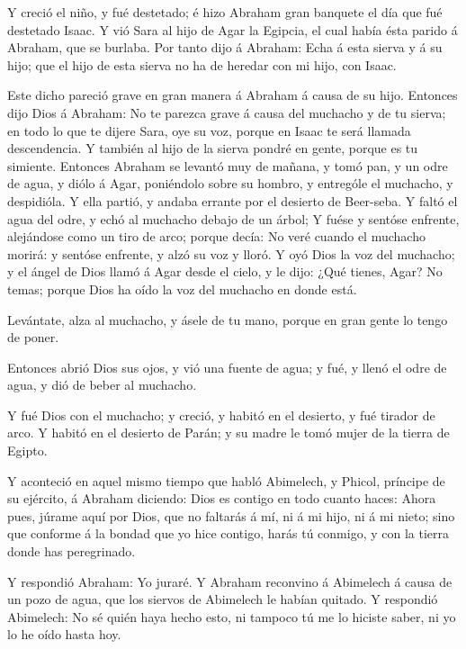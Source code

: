  Y creció el niño, y fué destetado; é hizo Abraham gran
banquete el día que fué destetado Isaac.  Y vió Sara al hijo
de Agar la Egipcia, el cual había ésta parido á Abraham, que se burlaba.
 Por tanto dijo á Abraham: Echa á esta sierva y á su hijo;
que el hijo de esta sierva no ha de heredar con mi hijo, con Isaac.

 Este dicho pareció grave en gran manera á Abraham á causa
de su hijo.  Entonces dijo Dios á Abraham: No te parezca
grave á causa del muchacho y de tu sierva; en todo lo que te dijere
Sara, oye su voz, porque en Isaac te será llamada descendencia.
 Y también al hijo de la sierva pondré en gente, porque es
tu simiente.  Entonces Abraham se levantó muy de mañana, y
tomó pan, y un odre de agua, y diólo á Agar, poniéndolo sobre su hombro,
y entrególe el muchacho, y despidióla. Y ella partió, y andaba errante
por el desierto de Beer-seba.  Y faltó el agua del odre, y
echó al muchacho debajo de un árbol;  Y fuése y sentóse
enfrente, alejándose como un tiro de arco; porque decía: No veré cuando
el muchacho morirá: y sentóse enfrente, y alzó su voz y lloró.
 Y oyó Dios la voz del muchacho; y el ángel de Dios llamó á
Agar desde el cielo, y le dijo: ¿Qué tienes, Agar? No temas; porque Dios
ha oído la voz del muchacho en donde está.

 Levántate, alza al muchacho, y ásele de tu mano, porque en
gran gente lo tengo de poner.

 Entonces abrió Dios sus ojos, y vió una fuente de agua; y
fué, y llenó el odre de agua, y dió de beber al muchacho.

 Y fué Dios con el muchacho; y creció, y habitó en el
desierto, y fué tirador de arco.  Y habitó en el desierto
de Parán; y su madre le tomó mujer de la tierra de Egipto.

 Y aconteció en aquel mismo tiempo que habló Abimelech, y
Phicol, príncipe de su ejército, á Abraham diciendo: Dios es contigo en
todo cuanto haces:  Ahora pues, júrame aquí por Dios, que
no faltarás á mí, ni á mi hijo, ni á mi nieto; sino que conforme á la
bondad que yo hice contigo, harás tú conmigo, y con la tierra donde has
peregrinado.

 Y respondió Abraham: Yo juraré.  Y Abraham
reconvino á Abimelech á causa de un pozo de agua, que los siervos de
Abimelech le habían quitado.  Y respondió Abimelech: No sé
quién haya hecho esto, ni tampoco tú me lo hiciste saber, ni yo lo he
oído hasta hoy.

